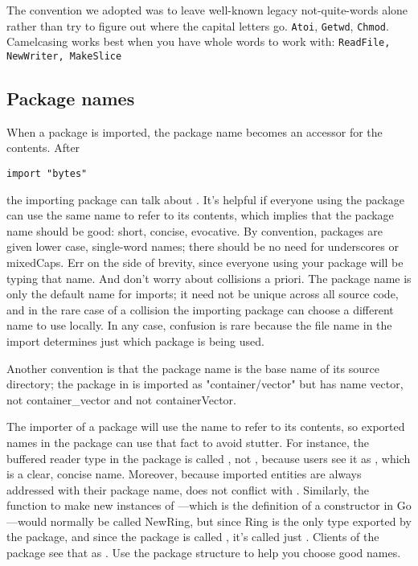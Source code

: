 The convention we adopted was to leave well-known legacy
not-quite-words alone rather than try to figure out where
the capital letters go.  \lstinline{Atoi}, \lstinline{Getwd},
\lstinline{Chmod}.
Camelcasing works best when you have whole words
to work with: \lstinline{ReadFile, NewWriter, MakeSlice}

\subsection{Package names}
When a package is imported, the package name becomes an accessor for the
contents. After
\begin{lstlisting}
import "bytes"
\end{lstlisting}
the importing package can talk about . It's helpful if
everyone using the package can use the same name to refer to its
contents, which implies that the package name should be good: short,
concise, evocative. By convention, packages are given lower case,
single-word names; there should be no need for underscores or mixedCaps.
Err on the side of brevity, since everyone using your package will be
typing that name. And don't worry about collisions a priori. The package
name is only the default name for imports; it need not be unique across
all source code, and in the rare case of a collision the importing
package can choose a different name to use locally. In any case,
confusion is rare because the file name in the import determines just
which package is being used.

Another convention is that the package name is the base name of its
source directory; the package in  is imported as
"container/vector" but has name vector, not container\_vector and not
containerVector.

The importer of a package will use the name to refer to its contents, so 
exported names in the package can use that fact to avoid
stutter. For instance, the buffered reader type in the  package is
called , not , because users see it as
,
which is a clear, concise name. Moreover, because imported entities are
always addressed with their package name,  does not conflict
with . Similarly, the function to make new instances of
---which is the definition of a constructor in Go---would normally
be called NewRing, but since Ring is the only type exported by the
package, and since the package is called , it's called
just .
Clients of the package see that as . Use the package structure
to help you choose good names.

